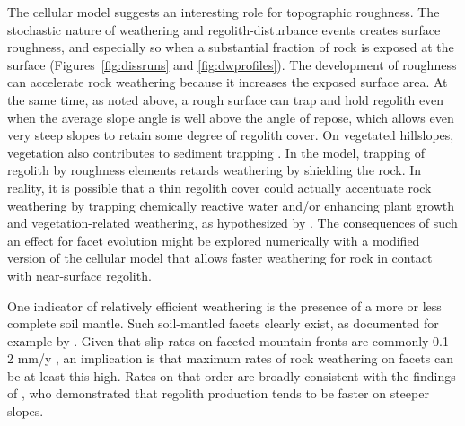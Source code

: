 The cellular model suggests an interesting role for topographic roughness. The stochastic nature of weathering and regolith-disturbance events creates surface roughness, and especially so when a substantial fraction of rock is exposed at the surface (Figures~\ref{fig:dissruns} and \ref{fig:dwprofiles}). The development of roughness can accelerate rock weathering because it increases the exposed surface area. At the same time, as noted above, a rough surface can trap and hold regolith even when the average slope angle is well above the angle of repose, which allows even very steep slopes to retain some degree of regolith cover. On vegetated hillslopes, vegetation also contributes to sediment trapping \citep{dibiase2013vegetation,doane2018nonlocal}. In the model, trapping of regolith by roughness elements retards weathering by shielding the rock. In reality, it is possible that a thin regolith cover could actually accentuate rock weathering by trapping chemically reactive water and/or enhancing plant growth and vegetation-related weathering, as hypothesized by \citet{gilbert1877report}. The consequences of such an effect for facet evolution might be explored numerically with a modified version of the cellular model that allows faster weathering for rock in contact with near-surface regolith.


One indicator of relatively efficient weathering is the presence of a more or less complete soil mantle. Such soil-mantled facets clearly exist, as documented for example by \citet{menges1990soils}. Given that slip rates on faceted mountain fronts are commonly 0.1--2 mm/y \citep{depolo2000estimating}, an implication is that maximum rates of rock weathering on facets can be at least this high. Rates on that order are broadly consistent with the findings of \citet{heimsath2012soil}, who demonstrated  that regolith production tends to be faster on steeper slopes.

